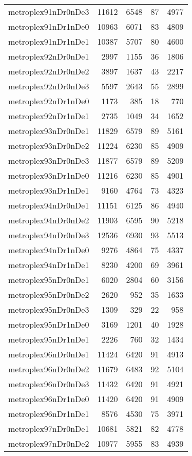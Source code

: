 \documentclass[../../../thesis.tex]{subfiles}
\begin{document}
\begin{longtable}{lrrrr}
metroplex91nDr0nDe3 & 11612 & 6548 & 87 & 4977 \\
metroplex91nDr1nDe0 & 10963 & 6071 & 83 & 4809 \\
metroplex91nDr1nDe1 & 10387 & 5707 & 80 & 4600 \\
metroplex92nDr0nDe1 & 2997 & 1155 & 36 & 1806 \\
metroplex92nDr0nDe2 & 3897 & 1637 & 43 & 2217 \\
metroplex92nDr0nDe3 & 5597 & 2643 & 55 & 2899 \\
metroplex92nDr1nDe0 & 1173 & 385 & 18 & 770 \\
metroplex92nDr1nDe1 & 2735 & 1049 & 34 & 1652 \\
metroplex93nDr0nDe1 & 11829 & 6579 & 89 & 5161 \\
metroplex93nDr0nDe2 & 11224 & 6230 & 85 & 4909 \\
metroplex93nDr0nDe3 & 11877 & 6579 & 89 & 5209 \\
metroplex93nDr1nDe0 & 11216 & 6230 & 85 & 4901 \\
metroplex93nDr1nDe1 & 9160 & 4764 & 73 & 4323 \\
metroplex94nDr0nDe1 & 11151 & 6125 & 86 & 4940 \\
metroplex94nDr0nDe2 & 11903 & 6595 & 90 & 5218 \\
metroplex94nDr0nDe3 & 12536 & 6930 & 93 & 5513 \\
metroplex94nDr1nDe0 & 9276 & 4864 & 75 & 4337 \\
metroplex94nDr1nDe1 & 8230 & 4200 & 69 & 3961 \\
metroplex95nDr0nDe1 & 6020 & 2804 & 60 & 3156 \\
metroplex95nDr0nDe2 & 2620 & 952 & 35 & 1633 \\
metroplex95nDr0nDe3 & 1309 & 329 & 22 & 958 \\
metroplex95nDr1nDe0 & 3169 & 1201 & 40 & 1928 \\
metroplex95nDr1nDe1 & 2226 & 760 & 32 & 1434 \\
metroplex96nDr0nDe1 & 11424 & 6420 & 91 & 4913 \\
metroplex96nDr0nDe2 & 11679 & 6483 & 92 & 5104 \\
metroplex96nDr0nDe3 & 11432 & 6420 & 91 & 4921 \\
metroplex96nDr1nDe0 & 11420 & 6420 & 91 & 4909 \\
metroplex96nDr1nDe1 & 8576 & 4530 & 75 & 3971 \\
metroplex97nDr0nDe1 & 10681 & 5821 & 82 & 4778 \\
metroplex97nDr0nDe2 & 10977 & 5955 & 83 & 4939 \\

\end{longtable}
\end{document}
